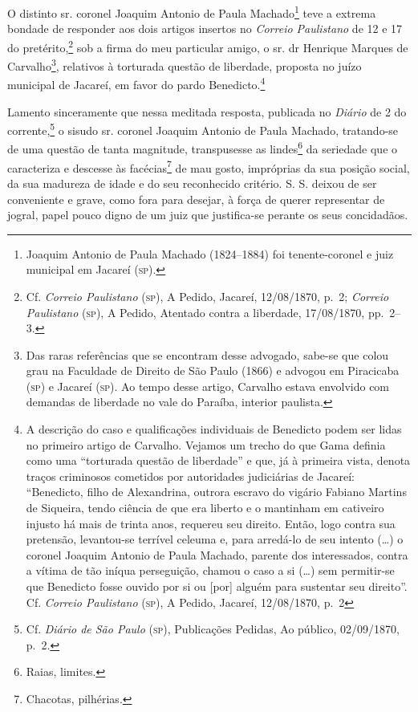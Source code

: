 O distinto sr. coronel Joaquim Antonio de Paula Machado\footnote{
  Joaquim Antonio de Paula Machado (1824--1884) foi tenente-coronel e
  juiz municipal em Jacareí (\textsc{sp}).} teve a extrema bondade de responder
aos dois artigos insertos no \emph{Correio Paulistano} de 12 e 17 do
pretérito,\footnote{ Cf. \emph{Correio Paulistano} (\textsc{sp}), A Pedido,
  Jacareí, 12/08/1870, p.~2; \emph{Correio Paulistano} (\textsc{sp}), A Pedido,
  Atentado contra a liberdade, 17/08/1870, pp.~2--3.} sob a firma do meu
particular amigo, o sr. dr Henrique Marques de Carvalho\footnote{ Das
  raras referências que se encontram desse advogado, sabe-se que colou
  grau na Faculdade de Direito de São Paulo (1866) e advogou em
  Piracicaba (\textsc{sp}) e Jacareí (\textsc{sp}). Ao tempo desse artigo, Carvalho estava
  envolvido com demandas de liberdade no vale do Paraíba, interior
  paulista.}, relativos à torturada questão de liberdade, proposta no
juízo municipal de Jacareí, em favor do pardo Benedicto.\footnote{ A
  descrição do caso e qualificações individuais de Benedicto podem ser
  lidas no primeiro artigo de Carvalho. Vejamos um trecho do que Gama
  definia como uma ``torturada questão de liberdade'' e que, já à primeira
  vista, denota traços criminosos cometidos por autoridades judiciárias
  de Jacareí: ``Benedicto, filho de Alexandrina, outrora escravo do
  vigário Fabiano Martins de Siqueira, tendo ciência de que era liberto
  e o mantinham em cativeiro injusto há mais de trinta anos, requereu
  seu direito. Então, logo contra sua pretensão, levantou-se terrível
  celeuma e, para arredá-lo de seu intento (\ldots{}) o coronel Joaquim
  Antonio de Paula Machado, parente dos interessados, contra a vítima de
  tão iníqua perseguição, chamou o caso a si (\ldots{}) sem permitir-se que
  Benedicto fosse ouvido por si ou {[}por{]} alguém para sustentar seu
  direito''. Cf. \emph{Correio Paulistano} (\textsc{sp}), A Pedido, Jacareí,
  12/08/1870, p.~2}

Lamento sinceramente que nessa meditada resposta, publicada no
\emph{Diário} de 2 do corrente,\footnote{ Cf. \emph{Diário de São Paulo}
  (\textsc{sp}), Publicações Pedidas, Ao público, 02/09/1870, p.~2.} o sisudo sr.
coronel Joaquim Antonio de Paula Machado, tratando-se de uma questão de
tanta magnitude, transpusesse as lindes\footnote{ Raias, limites.} da
seriedade que o caracteriza e descesse às facécias\footnote{ Chacotas,
  pilhérias.} de mau gosto, impróprias da sua posição social, da sua
madureza de idade e do seu reconhecido critério. S. S. deixou de ser
conveniente e grave, como fora para desejar, à força de querer
representar de jogral, papel pouco digno de um juiz que justifica-se
perante os seus concidadãos.


